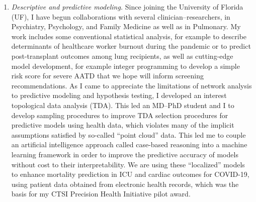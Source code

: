 \documentclass{nihbiosketch}
\begin{document}
\begin{enumerate}
\item \emph{Descriptive and predictive modeling.}
Since joining the University of Florida (UF), I have begun collaborations with several clinician--researchers, in Psychiatry, Psychology, and Family Medicine as well as in Pulmonary.
My work includes some conventional statistical analysis, for example to describe determinants of healthcare worker burnout during the pandemic or to predict post-transplant outcomes among lung recipients, as well as cutting-edge model development, for example integer programming to develop a simple risk score for severe AATD that we hope will inform screening recommendations.
As I came to appreciate the limitations of network analysis to predictive modeling and hypothesis testing, I developed an interest topological data analysis (TDA). This led an MD--PhD student and I to develop sampling procedures to improve TDA selection procedures for predictive models using health data, which violates many of the implicit assumptions satisfied by so-called ``point cloud'' data.
This led me to couple an artificial intelligence approach called case-based reasoning into a machine learning framework in order to improve the predictive accuracy of models without cost to their interpretability. We are using these ``localized'' models to enhance mortality prediction in ICU and cardiac outcomes for COVID-19, using patient data obtained from electronic health records, which was the basis for my CTSI Precision Health Initiative pilot award.


\end{enumerate}
\end{document}
